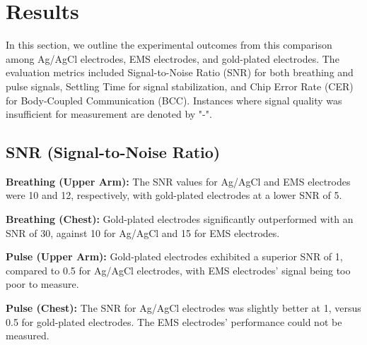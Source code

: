 \documentclass[conference]{IEEEtran}
\begin{document}



%

\section{Results}

In this section, we outline the experimental outcomes from this comparison among Ag/AgCl electrodes, EMS electrodes, and gold-plated electrodes. The evaluation metrics included Signal-to-Noise Ratio (SNR) for both breathing and pulse signals, Settling Time for signal stabilization, and Chip Error Rate (CER) for Body-Coupled Communication (BCC). Instances where signal quality was insufficient for measurement are denoted by "-".

\subsection{SNR (Signal-to-Noise Ratio)}

 \textbf{Breathing (Upper Arm):} The SNR values for Ag/AgCl and EMS electrodes were 10 and 12, respectively, with gold-plated electrodes at a lower SNR of 5.
 
\textbf{Breathing (Chest):} Gold-plated electrodes significantly outperformed with an SNR of 30, against 10 for Ag/AgCl and 15 for EMS electrodes.

 \textbf{Pulse (Upper Arm):} Gold-plated electrodes exhibited a superior SNR of 1, compared to 0.5 for Ag/AgCl electrodes, with EMS electrodes' signal being too poor to measure.

 \textbf{Pulse (Chest):} The SNR for Ag/AgCl electrodes was slightly better at 1, versus 0.5 for gold-plated electrodes. The EMS electrodes' performance could not be measured.
\end{document}
